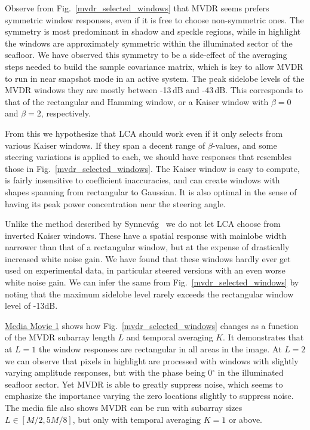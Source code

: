 \documentclass[10pt,journal,draftclsnofoot,onecolumn]{IEEEtran}
\newcommand\Fig[1]{Fig.~\ref{#1}}
\newcommand\1{\vec 1}
\newcommand\multimedia[2]{\href{#1}{#2}}
\newcommand\mediaPath{gfx/media}
\newcommand\mediaI{\multimedia{\mediaPath/media1.mp4}{Media Movie 1}}
\begin{document}
Observe from \Fig{mvdr_selected_windows} that MVDR seems prefers symmetric window responses, even if it is free to choose non-symmetric ones. The symmetry is most predominant in shadow and speckle regions, while in highlight the windows are approximately symmetric within the illuminated sector of the seafloor. We have observed this symmetry to be a side-effect of the averaging steps needed to build the sample covariance matrix, which is key to allow  MVDR to run in near snapshot mode in an active system. The peak sidelobe levels of the MVDR windows they are mostly between -13\,dB and -43\,dB. This corresponds to that of the rectangular and Hamming window, or a Kaiser window with $\beta=0$ and $\beta=2$, respectively.

From this we hypothesize that LCA should work even if it only selects from various Kaiser windows. If they span a decent range of $\beta$-values, and some steering variations is applied to each, we should have responses that resembles those in \Fig{mvdr_selected_windows}. The Kaiser window is easy to compute, is fairly insensitive to coefficient inaccuracies, and can create windows with shapes spanning from rectangular to Gaussian. It is also optimal in the sense of having its peak power concentration near the steering angle.

Unlike the method described by Synnev\aa{}g~\cite{Synnevag2008} we do not let LCA choose from  inverted Kaiser windows. These have a spatial response with mainlobe width narrower than that of a rectangular window, but at the expense of drastically increased white noise gain. We have found that these windows hardly ever get used on experimental data, in particular steered versions with an even worse white noise gain. We can infer the same from \Fig{mvdr_selected_windows} by noting that the maximum sidelobe level rarely exceeds the rectangular window level of -13\;dB.

\mediaI{} shows how \Fig{mvdr_selected_windows} changes as a function of the MVDR subarray length $L$ and temporal averaging $K$. It demonstrates that at $L=1$ the window responses are rectangular in all areas in the image. At $L=2$ we can observe that pixels in highlight are processed with windows with slightly varying amplitude responses, but with the phase being 0$^\circ$ in the illuminated seafloor sector. Yet MVDR is able to greatly suppress noise, which seems to emphasize the importance varying the zero locations slightly to suppress noise. The media file also shows MVDR can be run with subarray sizes $L\in[M/2,5M/8]$, but only with temporal averaging $K=1$ or above.
\end{document}

